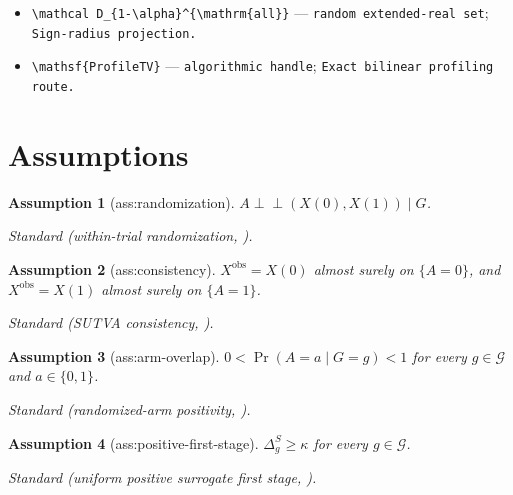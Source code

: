 \documentclass{article}
\newtheorem{assumption}{Assumption}
\begin{document}
\begin{itemize}
  \item \texttt{\textbackslash{}\allowbreak{}mathcal D\_\allowbreak{}\{1-\allowbreak{}\textbackslash{}\allowbreak{}alpha\}\allowbreak{}\textasciicircum{}\{\textbackslash{}\allowbreak{}mathrm\{all\}\allowbreak{}\}\allowbreak{}} --- \texttt{random extended-\allowbreak{}real set}; \texttt{Sign-\allowbreak{}radius projection.}
  \item \texttt{\textbackslash{}\allowbreak{}mathsf\{ProfileTV\}\allowbreak{}} --- \texttt{algorithmic handle}; \texttt{Exact bilinear profiling route.}
\end{itemize}

\section{Assumptions}

\begin{assumption}[ass:randomization]\label{ass:randomization}
\(A\mathrel{\perp\!\!\!\perp}(X(0),X(1))\mid G\).
\par\smallskip\noindent\emph{Standard} (within-trial randomization, \cite{JiangDingGeng2016}).
\end{assumption}

\begin{assumption}[ass:consistency]\label{ass:consistency}
\(X^{\mathrm{obs}}=X(0)\) almost surely on \(\{A=0\}\), and \(X^{\mathrm{obs}}=X(1)\) almost surely on \(\{A=1\}\).
\par\smallskip\noindent\emph{Standard} (SUTVA consistency, \cite{ImbensRubin2015}).
\end{assumption}

\begin{assumption}[ass:arm-overlap]\label{ass:arm-overlap}
\(0<\Pr(A=a\mid G=g)<1\) for every \(g\in\mathcal G\) and \(a\in\{0,1\}\).
\par\smallskip\noindent\emph{Standard} (randomized-arm positivity, \cite{JiangDingGeng2016}).
\end{assumption}

\begin{assumption}[ass:positive-first-stage]\label{ass:positive-first-stage}
\(\Delta_g^S\ge\kappa\) for every \(g\in\mathcal G\).
\par\smallskip\noindent\emph{Standard} (uniform positive surrogate first stage, \cite{JiangDingGeng2016}).
\end{assumption}
\end{document}
